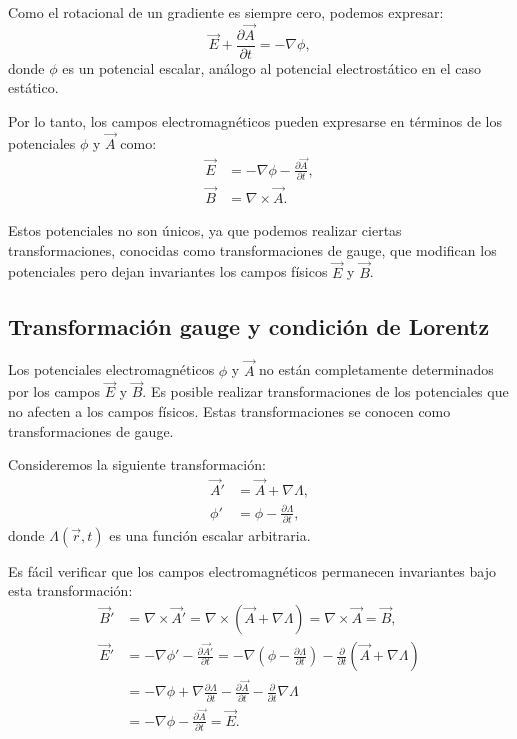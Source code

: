 \documentclass[12pt,a4paper]{book}
\begin{document}
Como el rotacional de un gradiente es siempre cero, podemos expresar:
\begin{equation}
\vec{E} + \frac{\partial \vec{A}}{\partial t} = -\nabla \phi,
\end{equation}
donde $\phi$ es un potencial escalar, análogo al potencial electrostático en el caso estático.

Por lo tanto, los campos electromagnéticos pueden expresarse en términos de los potenciales $\phi$ y $\vec{A}$ como:
\begin{align}
\vec{E} &= -\nabla \phi - \frac{\partial \vec{A}}{\partial t}, \\
\vec{B} &= \nabla \times \vec{A}.
\end{align}

Estos potenciales no son únicos, ya que podemos realizar ciertas transformaciones, conocidas como transformaciones de gauge, que modifican los potenciales pero dejan invariantes los campos físicos $\vec{E}$ y $\vec{B}$.

\subsection{Transformación gauge y condición de Lorentz}

Los potenciales electromagnéticos $\phi$ y $\vec{A}$ no están completamente determinados por los campos $\vec{E}$ y $\vec{B}$. Es posible realizar transformaciones de los potenciales que no afecten a los campos físicos. Estas transformaciones se conocen como transformaciones de gauge.

Consideremos la siguiente transformación:
\begin{align}
\vec{A}' &= \vec{A} + \nabla \Lambda, \\
\phi' &= \phi - \frac{\partial \Lambda}{\partial t},
\end{align}
donde $\Lambda(\vec{r}, t)$ es una función escalar arbitraria.

Es fácil verificar que los campos electromagnéticos permanecen invariantes bajo esta transformación:
\begin{align}
\vec{B}' &= \nabla \times \vec{A}' = \nabla \times (\vec{A} + \nabla \Lambda) = \nabla \times \vec{A} = \vec{B}, \\
\vec{E}' &= -\nabla \phi' - \frac{\partial \vec{A}'}{\partial t} = -\nabla \left(\phi - \frac{\partial \Lambda}{\partial t}\right) - \frac{\partial}{\partial t}\left(\vec{A} + \nabla \Lambda\right) \\
&= -\nabla \phi + \nabla \frac{\partial \Lambda}{\partial t} - \frac{\partial \vec{A}}{\partial t} - \frac{\partial}{\partial t}\nabla \Lambda \\
&= -\nabla \phi - \frac{\partial \vec{A}}{\partial t} = \vec{E}.
\end{align}
\end{document}
